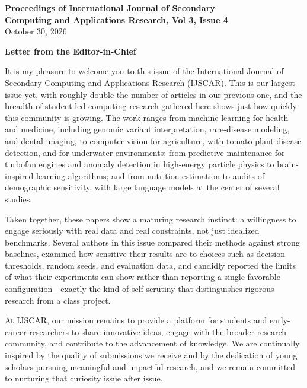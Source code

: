 \documentclass[10pt,letterpaper]{article}
\begin{document}
\vspace*{0.15in}
\begin{center}
{\Large\bfseries Proceedings of International Journal of Secondary\\ Computing and Applications Research, Vol 3, Issue 4}\\[2.4ex]
October 30, 2026
\end{center}
\vspace{1.2ex}
{\large\bfseries Letter from the Editor-in-Chief}\par\vspace{1ex}

It is my pleasure to welcome you to this issue of the International Journal of Secondary Computing and Applications Research (IJSCAR). This is our largest issue yet, with roughly double the number of articles in our previous one, and the breadth of student-led computing research gathered here shows just how quickly this community is growing. The work ranges from machine learning for health and medicine, including genomic variant interpretation, rare-disease modeling, and dental imaging, to computer vision for agriculture, with tomato plant disease detection, and for underwater environments; from predictive maintenance for turbofan engines and anomaly detection in high-energy particle physics to brain-inspired learning algorithms; and from nutrition estimation to audits of demographic sensitivity, with large language models at the center of several studies.

Taken together, these papers show a maturing research instinct: a willingness to engage seriously with real data and real constraints, not just idealized benchmarks. Several authors in this issue compared their methods against strong baselines, examined how sensitive their results are to choices such as decision thresholds, random seeds, and evaluation data, and candidly reported the limits of what their experiments can show rather than reporting a single favorable configuration---exactly the kind of self-scrutiny that distinguishes rigorous research from a class project.

At IJSCAR, our mission remains to provide a platform for students and early-career researchers to share innovative ideas, engage with the broader research community, and contribute to the advancement of knowledge. We are continually inspired by the quality of submissions we receive and by the dedication of young scholars pursuing meaningful and impactful research, and we remain committed to nurturing that curiosity issue after issue.
\end{document}
